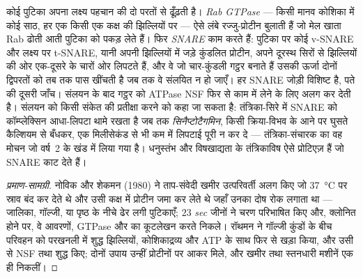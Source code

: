 \begin{definition}[लक्ष्यन और संलयन]\label{def:b3:membrane-traffic:fusion}
कोई पुटिका अपना लक्ष्य पहचान की दो परतों से ढूँढ़ती है। \emph{Rab
GTPase} --- किसी मानव कोशिका में कोई साठ, हर एक किसी एक कक्ष की
झिल्लियों पर --- ऐसे लंबे रज्जु-प्रोटीन बुलाती हैं जो मेल खाता Rab ढोती
आती पुटिका को पकड़ लेते हैं। फिर \emph{SNARE} काम करते हैं: पुटिका पर
कोई v-SNARE और लक्ष्य पर t-SNARE, यानी अपनी झिल्लियों में जड़े कुंडलित
प्रोटीन, अपने दूरस्थ सिरों से झिल्लियों की ओर एक-दूसरे के चारों ओर
लिपटते हैं, और वे जो चार-कुंडली गट्ठर बनाते हैं उसकी ऊर्जा दोनों
द्विपरतों को तब तक पास खींचती है जब तक वे संलयित न हो जाएँ। हर SNARE
जोड़ी विशिष्ट है, पते की दूसरी जाँच। संलयन के बाद गट्ठर को ATPase NSF
फिर से काम में लेने के लिए अलग कर देती है। संलयन को किसी संकेत की
प्रतीक्षा करने को कहा जा सकता है: तंत्रिका-सिरे में SNARE को कॉम्प्लेक्सिन
आधा-लिपटा थामे रखता है जब तक \emph{सिनैप्टोटैगमिन}, किसी क्रिया-विभव के
आने पर घुसते कैल्शियम से बँधकर, एक मिलीसेकंड से भी कम में लिपटाई पूरी न
कर दे --- तंत्रिका-संचारक का वह मोचन जो वर्ष~2 के खंड में लिया गया है।
धनुस्तंभ और विषखाद्यता के तंत्रिकाविष ऐसे प्रोटिएज़ हैं जो SNARE काट
देते हैं।
\end{definition}

\begin{proof}[प्रमाण-सामग्री]
नोविक और शेकमन (1980) ने ताप-संवेदी खमीर उत्परिवर्ती अलग किए जो
\qty{37}{\celsius} पर स्राव बंद कर देते थे और उसी कक्ष में प्रोटीन जमा
कर लेते थे जहाँ उनका दोष रोक लगाता था --- जालिका, गॉल्जी, या पृष्ठ के
नीचे ढेर लगी पुटिकाएँ; $23$ \emph{sec} जीनों ने चरण परिभाषित किए और,
क्लोनित होने पर, वे आवरणों, GTPase और  का कूटलेखन करते निकले।
रॉथमन ने गॉल्जी कुंडों के बीच परिवहन को परखनली में शुद्ध झिल्लियों,
कोशिकाद्रव्य और ATP के साथ फिर से खड़ा किया, और उसी से NSF तथा 
शुद्ध किए; दोनों उपाय उन्हीं प्रोटीनों पर आकर मिले, और खमीर तथा
स्तनधारी मशीनें एक ही निकलीं।
\end{proof}

